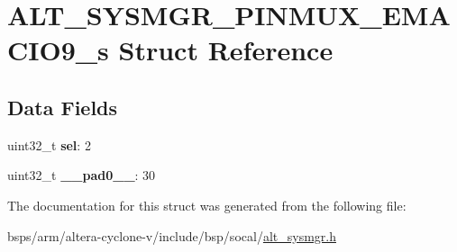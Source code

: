 \hypertarget{structALT__SYSMGR__PINMUX__EMACIO9__s}{}\section{A\+L\+T\+\_\+\+S\+Y\+S\+M\+G\+R\+\_\+\+P\+I\+N\+M\+U\+X\+\_\+\+E\+M\+A\+C\+I\+O9\+\_\+s Struct Reference}
\label{structALT__SYSMGR__PINMUX__EMACIO9__s}
\subsection*{Data Fields}
\begin{DoxyCompactItemize}
\item 
\mbox{\label{structALT__SYSMGR__PINMUX__EMACIO9__s_adf4c182167516f6fc6525dec2d66ed9b}} 
uint32\+\_\+t {\bfseries sel}\+: 2
\item 
\mbox{\label{structALT__SYSMGR__PINMUX__EMACIO9__s_a653420ec27dc1d1398e997db1aeff570}} 
uint32\+\_\+t {\bfseries \+\_\+\+\_\+pad0\+\_\+\+\_\+}\+: 30
\end{DoxyCompactItemize}


The documentation for this struct was generated from the following file\+:\begin{DoxyCompactItemize}
\item 
bsps/arm/altera-\/cyclone-\/v/include/bsp/socal/\mbox{\hyperlink{alt__sysmgr_8h}{alt\+\_\+sysmgr.\+h}}\end{DoxyCompactItemize}
